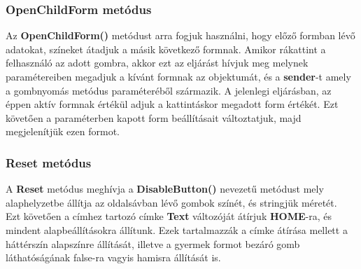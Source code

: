 \documentclass[tocnopagenum]{thesis-ekf}
\theoremstyle{definition}
\theoremstyle{remark}
\begin{document}
	\subsubsection{OpenChildForm metódus}
	Az \textbf{OpenChildForm()} metódust arra fogjuk használni, hogy előző formban lévő adatokat, színeket átadjuk a másik következő formnak. Amikor rákattint a felhasználó az adott gombra, akkor ezt az eljárást hívjuk meg melynek paramétereiben megadjuk a kívánt formnak az objektumát, és a \textbf{sender}-t amely a gombnyomás metódus paraméteréből származik. A jelenlegi eljárásban, az éppen aktív formnak értékül adjuk a kattintáskor megadott form értékét. Ezt követően a paraméterben kapott form beállításait változtatjuk, majd megjelenítjük ezen formot. 
	\subsubsection{Reset metódus}
	A \textbf{Reset} metódus meghívja a \textbf{DisableButton()} nevezetű metódust mely alaphelyzetbe állítja az oldalsávban lévő gombok színét, és stringjük méretét.
	\\
	Ezt követően a címhez tartozó címke \textbf{Text} változóját átírjuk \textbf{HOME}-ra, és mindent alapbeállításokra állítunk. Ezek tartalmazzák a címke átírása mellett a háttérszín alapszínre állítását, illetve a gyermek formot bezáró gomb láthatóságának false-ra vagyis hamisra állítását is.
	\\
\end{document}

